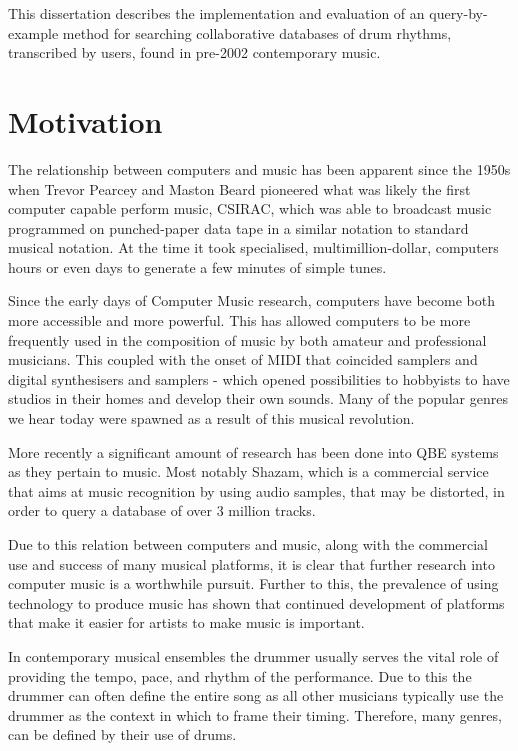 \documentclass[12pt,twoside,notitlepage]{report}
\begin{document}
	This dissertation describes the implementation and evaluation of an query-by-example method for searching collaborative databases of drum rhythms, transcribed by users, found in pre-2002 contemporary music.
	
	\section{Motivation}
	The relationship between computers and music has been apparent since the 1950s when Trevor Pearcey and Maston Beard pioneered what was likely the first computer capable perform music, CSIRAC\footnotemark {}, which was able to broadcast music programmed on punched-paper data tape in a similar notation to standard musical notation\cite{CSIRAC}. At the time it took specialised, multimillion-dollar, computers hours or even days to generate a few minutes of simple tunes\cite{Mathews1963}.
	
	Since the early days of Computer Music research, computers have become both more accessible and more powerful. This has allowed computers to be more frequently used in the composition of music by both amateur and professional musicians. This coupled with the onset of MIDI\footnotemark {} that coincided samplers and digital synthesisers and samplers - which opened possibilities to hobbyists to have studios in their homes and develop their own sounds. Many of the popular genres we hear today were spawned as a result of this musical revolution.
	
	More recently a significant amount of research has been done into QBE\footnotemark {} systems as they pertain to music. Most notably Shazam\cite{Shazam}, which is a commercial service that aims at music recognition by using audio samples, that may be distorted, in order to query a database of over 3 million tracks.
	
	Due to this relation between computers and music, along with the commercial use and success of many musical platforms, it is clear that further research into computer music is a worthwhile pursuit. Further to this, the prevalence of using technology to produce music has shown that continued development of platforms that make it easier for artists to make music is important.
	
	In contemporary musical ensembles the drummer usually serves the vital role of providing the tempo, pace, and rhythm of the performance. Due to this the drummer can often define the entire song as all other musicians typically use the drummer as the context in which to frame their timing. Therefore, many genres, can be defined by their use of drums.
	
\end{document}
